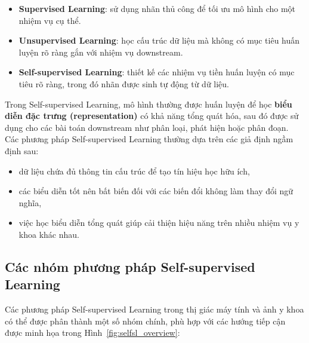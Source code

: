 \begin{itemize}
    \item \textbf{Supervised Learning}: sử dụng nhãn thủ công để tối ưu mô hình cho một nhiệm vụ cụ thể.
    \item \textbf{Unsupervised Learning}: học cấu trúc dữ liệu mà không có mục tiêu huấn luyện rõ ràng gắn với nhiệm vụ downstream.
    \item \textbf{Self-supervised Learning}: thiết kế các nhiệm vụ tiền huấn luyện có mục tiêu rõ ràng, trong đó nhãn được sinh tự động từ dữ liệu.
\end{itemize}

Trong Self-supervised Learning, mô hình thường được huấn luyện để học \textbf{biểu diễn đặc trưng (representation)} có khả năng tổng quát hóa, sau đó được sử dụng cho các bài toán downstream như phân loại, phát hiện hoặc phân đoạn. \\
Các phương pháp Self-supervised Learning thường dựa trên các giả định ngầm định sau:
\begin{itemize}
    \item dữ liệu chứa đủ thông tin cấu trúc để tạo tín hiệu học hữu ích,
    \item các biểu diễn tốt nên bất biến đối với các biến đổi không làm thay đổi ngữ nghĩa,
    \item việc học biểu diễn tổng quát giúp cải thiện hiệu năng trên nhiều nhiệm vụ y khoa khác nhau.
\end{itemize}

\subsection{Các nhóm phương pháp Self-supervised Learning}
\label{appendix:selfsl_methods}

Các phương pháp Self-supervised Learning trong thị giác máy tính và ảnh y khoa có thể được phân thành một số nhóm chính, phù hợp với các hướng tiếp cận được minh họa trong Hình~\ref{fig:selfsl_overview}:

